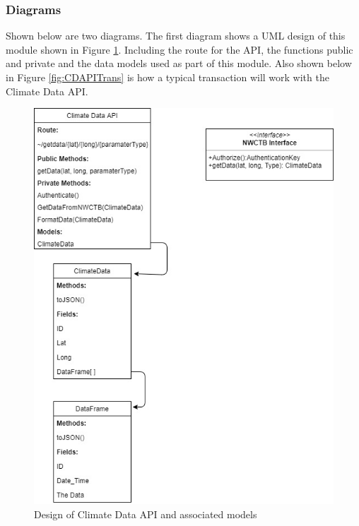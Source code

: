 \documentclass[onecolumn, draftclsnofoot,10pt, compsoc]{article}
\begin{document}
			\subsubsection{Diagrams}
				Shown below are two diagrams. The first diagram shows a UML design of this module shown in Figure \ref{fig:CDAPI}. Including the route for the API, the functions public and private and the data models used as part of this module. Also shown below in Figure \ref{fig:CDAPITrans} is how a typical transaction will work with the Climate Data API.\\
		\clearpage
		\begin{figure}[htb]
			\begin{center}
				\includegraphics[width=375pt]{UMLDiagrams/ClimateAPI.jpg}
			\end{center}
			\caption{Design of Climate Data API and associated models}
			\label{fig:CDAPI}
		\end{figure}
		\clearpage
\end{document}
